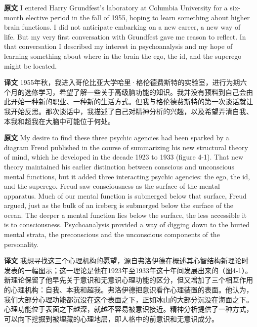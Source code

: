 \documentclass[UTF8,zihao=-4]{ctexart}
\newcommand{\BodyFont}{\fontsize{10.5pt}{15.5pt}\selectfont}
\newcommand{\origlabel}{\textbf{原文}\quad}
\newcommand{\translabel}{\textbf{译文}\quad}
\newenvironment{enblock}{\par\noindent\begingroup\BodyFont\origlabel}{\par\endgroup}
\newenvironment{zhblock}{\par\noindent\begingroup\BodyFont\translabel}{\par\endgroup\vspace{0.35em}}
\begin{document}
\begin{enblock}
I entered Harry Grundfest's laboratory at Columbia University for a six-month elective period in the fall of 1955, hoping to learn something about higher brain functions. I did not anticipate embarking on a new career, a new way of life. But my very first conversation with Grundfest gave me reason to reflect. In that conversation I described my interest in psychoanalysis and my hope of learning something about where in the brain the ego, the id, and the superego might be located.
\end{enblock}
\begin{zhblock}
1955年秋，我进入哥伦比亚大学哈里·格伦德费斯特的实验室，进行为期六个月的选修学习，希望了解一些关于高级脑功能的知识。我并没有预料到自己会由此开始一种新的职业、一种新的生活方式。但我与格伦德费斯特的第一次谈话就让我开始反思。那次谈话中，我描述了自己对精神分析的兴趣，以及希望弄清自我、本我和超我在大脑中可能位于何处。\end{zhblock}

\begin{enblock}
My desire to find these three psychic agencies had been sparked by a diagram Freud published in the course of summarizing his new structural theory of mind, which he developed in the decade 1923 to 1933 (figure 4-1). That new theory maintained his earlier distinction between conscious and unconscious mental functions, but it added three interacting psychic agencies: the ego, the id, and the superego. Freud saw consciousness as the surface of the mental apparatus. Much of our mental function is submerged below that surface, Freud argued, just as the bulk of an iceberg is submerged below the surface of the ocean. The deeper a mental function lies below the surface, the less accessible it is to consciousness. Psychoanalysis provided a way of digging down to the buried mental strata, the preconscious and the unconscious components of the personality.
\end{enblock}
\begin{zhblock}
我想寻找这三个心理机构的愿望，源自弗洛伊德在概述其心智结构新理论时发表的一幅图示；这一理论是他在1923年至1933年这十年间发展出来的（图4-1）。新理论保留了他早先关于意识和无意识心理功能的区分，但又增加了三个相互作用的心理机构：自我、本我和超我。弗洛伊德把意识看作心理装置的表面。他认为，我们大部分心理功能都沉没在这个表面之下，正如冰山的大部分沉没在海面之下。心理功能位于表面之下越深，就越不容易被意识接近。精神分析提供了一种方式，可以向下挖掘到被埋藏的心理地层，即人格中的前意识和无意识成分。\end{zhblock}
\end{document}
